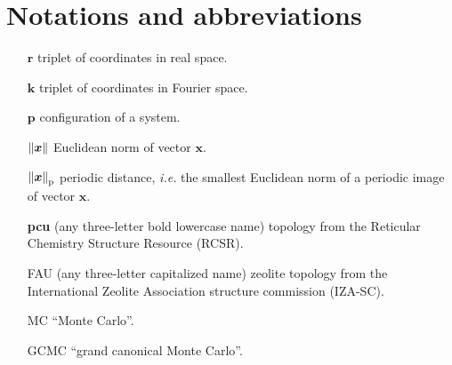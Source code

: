 \section*{Notations and abbreviations}
\begin{itemize}
    \item[$\boldsymbol r$] triplet of coordinates in real space.
    \item[$\boldsymbol k$] triplet of coordinates in Fourier space.
    \item[$\boldsymbol p$] configuration of a system.
    \item[$\left\|\boldsymbol x\right\|$] Euclidean norm of vector $\boldsymbol x$.
    \item[$\left\|\boldsymbol x\right\|_\text{p}$] periodic distance, \textit{i.e.} the smallest Euclidean norm of a periodic image of vector $\boldsymbol x$.
    \item[\bfseries{pcu}] (any three-letter bold lowercase name) topology from the Reticular Chemistry Structure Resource (RCSR).
    \item[FAU] (any three-letter capitalized name) zeolite topology from the International Zeolite Association structure commission (IZA-SC).
    \item[MC] ``Monte Carlo''.
    \item[GCMC] ``grand canonical Monte Carlo''.
\end{itemize}
